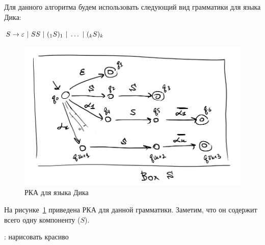 \begin{note}    
    Для данного алгоритма будем использовать следующий вид грамматики для языка Дика:

    $S \rightarrow \varepsilon~|~SS~|~(_1 S )_1~|~ \dots ~|~(_k S )_k$

    \begin{figure}[H]
        \includegraphics[width=0.75\linewidth]{img/dyck_box.png}
        \caption{РКА для языка Дика}
        \label{img:dyck_rsm}
    \end{figure}

    На рисунке~\ref{img:dyck_rsm} приведена РКА для данной грамматики. Заметим, что он содержит всего одну компоненту ($S$).

    \TODO: нарисовать красиво

\end{note}


